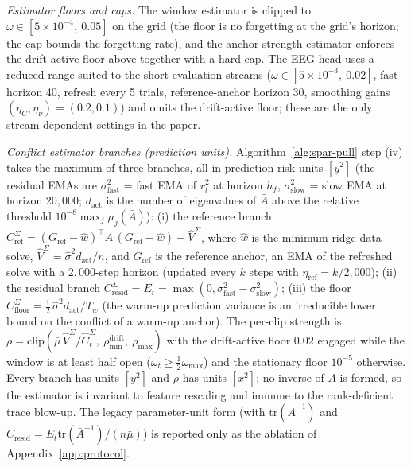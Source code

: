 \documentclass[11pt]{article}
\begin{document}
\emph{Estimator floors and caps.}
The window estimator is clipped to $\omega \in [5 \times 10^{-4},\ 0.05]$ on the grid (the floor is no forgetting at the grid's horizon; the cap bounds the forgetting rate), and the anchor-strength estimator enforces the drift-active floor above together with a hard cap.
The EEG head uses a reduced range suited to the short evaluation streams ($\omega \in [5 \times 10^{-3},\ 0.02]$, fast horizon 40, refresh every 5 trials, reference-anchor horizon 30, smoothing gains $(\eta_C,\eta_\nu) = (0.2, 0.1)$) and omits the drift-active floor; these are the only stream-dependent settings in the paper.

\emph{Conflict estimator branches (prediction units).}
Algorithm~\ref{alg:spar-pull} step (iv) takes the maximum of three branches, all in prediction-risk units $[y^2]$ (the residual EMAs are $\sigma^2_{\mathrm{fast}}$ = fast EMA of $r_t^2$ at horizon $h_f$, $\sigma^2_{\mathrm{slow}}$ = slow EMA at horizon $20{,}000$; $d_{\mathrm{act}}$ is the number of eigenvalues of $\bar A$ above the relative threshold $10^{-8}\max_j\mu_j(\bar A)$):
(i) the reference branch $C^\Sigma_{\mathrm{ref}} = (G_{\mathrm{ref}} - \widehat w)^\top \bar A\,(G_{\mathrm{ref}} - \widehat w) - \widehat V^\Sigma$, where $\widehat w$ is the minimum-ridge data solve, $\widehat V^\Sigma = \hat\sigma^2 d_{\mathrm{act}}/n$, and $G_{\mathrm{ref}}$ is the reference anchor, an EMA of the refreshed solve with a $2{,}000$-step horizon (updated every $k$ steps with $\eta_{\mathrm{ref}} = k/2{,}000$);
(ii) the residual branch $C^\Sigma_{\mathrm{resid}} = E_t = \max(0, \sigma^2_{\mathrm{fast}} - \sigma^2_{\mathrm{slow}})$;
(iii) the floor $C^\Sigma_{\mathrm{floor}} = \tfrac12\,\hat\sigma^2 d_{\mathrm{act}}/T_w$ (the warm-up prediction variance is an irreducible lower bound on the conflict of a warm-up anchor).
The per-clip strength is $\rho = \mathrm{clip}(\bar\mu\,\widehat V^\Sigma/\widehat C^\Sigma_t,\ \rho_{\min}^{\mathrm{drift}},\ \rho_{\max})$ with the drift-active floor $0.02$ engaged while the window is at least half open ($\omega_t \ge \tfrac12\omega_{\max}$) and the stationary floor $10^{-5}$ otherwise.
Every branch has units $[y^2]$ and $\rho$ has units $[x^2]$; no inverse of $\bar A$ is formed, so the estimator is invariant to feature rescaling and immune to the rank-deficient trace blow-up.
The legacy parameter-unit form (with $\mathrm{tr}(\bar A^{-1})$ and $C_{\mathrm{resid}}=E_t\mathrm{tr}(\bar A^{-1})/(n\bar\mu)$) is reported only as the ablation of Appendix~\ref{app:protocol}.
\end{document}
